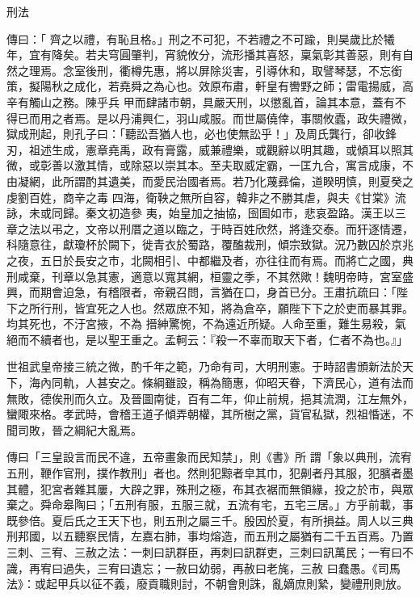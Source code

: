 
\begin{pinyinscope}

 刑法


傳曰：「
 齊之以禮，有恥且格。」刑之不可犯，不若禮之不可踰，則昊歲比於犧年，宜有降矣。若夫穹圓肇判，宵貌攸分，流形播其喜怒，稟氣彰其善惡，則有自然之理焉。念室後刑，衢樽先惠，將以屏除災害，引導休和，取譬琴瑟，不忘銜策，擬陽秋之成化，若堯舜之為心也。效原布肅，軒皇有轡野之師；雷電揚威，高辛有觸山之務。陳乎兵
 甲而肆諸市朝，具嚴天刑，以懲亂首，論其本意，蓋有不得已而用之者焉。是以丹浦興仁，羽山咸服。而世屬僥倖，事關攸蠹，政失禮微，獄成刑起，則孔子曰：「聽訟吾猶人也，必也使無訟乎！」及周氏龔行，卻收鋒刃，祖述生成，憲章堯禹，政有膏露，威兼禮樂，或觀辭以明其趣，或傾耳以照其微，或彰善以激其情，或除惡以崇其本。至夫取威定霸，一匡九合，寓言成康，不由凝網，此所謂酌其遺美，而愛民治國者焉。若乃化蔑彞倫，道睽明慎，則夏癸之虔劉百姓，商辛之毒
 四海，衛鞅之無所自容，韓非之不勝其虐，與夫《甘棠》流詠，未或同歸。秦文初造參
 夷，始皇加之抽協，囹圄如市，悲哀盈路。漢王以三章之法以弔之，文帝以刑厝之道以臨之，于時百姓欣然，將逢交泰。而犴逐情遷，科隨意往，獻瓊杯於闕下，徙青衣於蜀路，覆醢裁刑，傾宗致獄。況乃數囚於京兆之夜，五日於長安之市，北闕相引、中都繼及者，亦往往而有焉。而將亡之國，典刑咸棄，刊章以急其憲，適意以寬其網，桓靈之季，不其然歟！魏明帝時，宮室盛興，而期會迫急，有稽限者，帝親召問，言猶在口，身首已分。王肅抗疏曰：「陛下之所行刑，皆宜死之人也。然眾庶不知，將為倉卒，願陛下下之於吏而暴其罪。均其死也，不汙宮掖，不為
 搢紳驚惋，不為遠近所疑。人命至重，難生易殺，氣絕而不續者也，是以聖王重之。孟軻云：『殺一不辜而取天下者，仁者不為也。』」



 世祖武皇帝接三統之微，酌千年之範，乃命有司，大明刑憲。于時詔書頒新法於天下，海內同軌，人甚安之。條綱雖設，稱為簡惠，仰昭天眷，下濟民心，道有法而無敗，德俟刑而久立。及晉圖南徙，百有二年，仰止前規，挹其流潤，江左無外，蠻陬來格。孝武時，會稽王道子傾弄朝權，其所樹之黨，貨官私獄，烈祖惛迷，不聞司敗，晉之綱紀大亂焉。



 傳曰「三皇設言而民不違，五帝畫象而民知禁」，則《書》所
 謂「象以典刑，流宥五刑，鞭作官刑，撲作教刑」者也。然則犯黥者皁其巾，犯劓者丹其服，犯臏者墨其體，犯宮者雜其屢，大辟之罪，殊刑之極，布其衣裾而無領緣，投之於市，與眾棄之。舜命皋陶曰；「五刑有服，五服三就，五流有宅，五宅三居。」方乎前載，事既參倍。夏后氏之王天下也，則五刑之屬三千。殷因於夏，有所損益。周人以三典刑邦國，以五聽察民情，左嘉右肺，事均熔造，而五刑之屬猶有二千五百焉。乃置三刺、三宥、三赦之法：一刺曰訊群臣，再刺曰訊群吏，三刺曰訊萬民；一宥曰不識，再宥曰過失，三宥曰遺忘；一赦曰幼弱，再赦曰老旄，三赦
 曰蠢愚。《司馬法》：或起甲兵以征不義，廢貢職則討，不朝會則誅，亂嫡庶則縶，變禮刑則放。




\end{pinyinscope}
